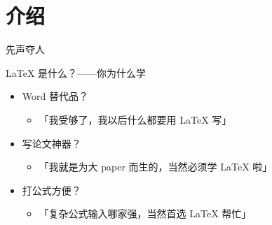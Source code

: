 \section{介绍}

\begin{frame}{先声夺人}
  \centering
\end{frame}

\begin{frame}{\LaTeX{} 是什么？\mbox{}——\mbox{}你为什么学}
\pause
\begin{itemize}
  \item<+-> Word 替代品？

    \begin{itemize}
      \item 「我受够了，我以后什么都要用 \LaTeX{} 写」
    \end{itemize}

  \item<+-> 写论文神器？

    \begin{itemize}
      \item 「我就是为大 paper 而生的，当然必须学 \LaTeX{} 啦」
    \end{itemize}

  \item<+-> 打公式方便？

    \begin{itemize}
      \item 「复杂公式输入哪家强，当然首选 \LaTeX{} 帮忙」
    \end{itemize}
\end{itemize}
\end{frame}


